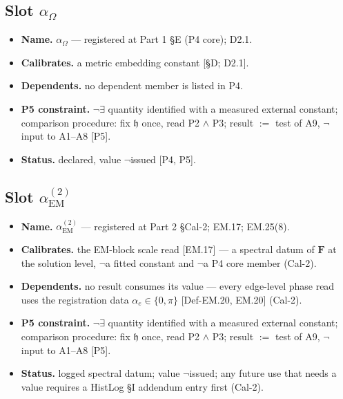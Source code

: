 \documentclass[11pt,openany]{report}
\theoremstyle{canonplain}
\theoremstyle{canondef}
\begin{document}
\subsection*{Slot $\alpha_\Omega$}
\begin{itemize}\setlength{\itemsep}{2pt}
\item \textbf{Name.} $\alpha_\Omega$ — registered at Part 1 §E (P4 core); D2.1.
\item \textbf{Calibrates.} a metric embedding constant [§D; D2.1].
\item \textbf{Dependents.} no dependent member is listed in P4.
\item \textbf{P5 constraint.} $\neg\exists$ quantity identified with a measured external constant; comparison procedure: fix $\mathfrak h$ once, read P2 $\wedge$ P3; result $:=$ test of A9, $\neg$ input to A1--A8 [P5].
\item \textbf{Status.} declared, value $\neg$issued [P4, P5].
\end{itemize}
\subsection*{Slot $\alpha_{\mathrm{EM}}^{(2)}$}
\begin{itemize}\setlength{\itemsep}{2pt}
\item \textbf{Name.} $\alpha_{\mathrm{EM}}^{(2)}$ — registered at Part 2 §Cal-2; EM.17; EM.25(8).
\item \textbf{Calibrates.} the EM-block scale read [EM.17] — a spectral datum of $\mathbf F$ at the solution level, $\neg$a fitted constant and $\neg$a P4 core member (Cal-2).
\item \textbf{Dependents.} no result consumes its value — every edge-level phase read uses the registration data $\alpha_e\in\{0,\pi\}$ [Def-EM.20, EM.20] (Cal-2).
\item \textbf{P5 constraint.} $\neg\exists$ quantity identified with a measured external constant; comparison procedure: fix $\mathfrak h$ once, read P2 $\wedge$ P3; result $:=$ test of A9, $\neg$ input to A1--A8 [P5].
\item \textbf{Status.} logged spectral datum; value $\neg$issued; any future use that needs a value requires a HistLog §I addendum entry first (Cal-2).
\end{itemize}
\end{document}
